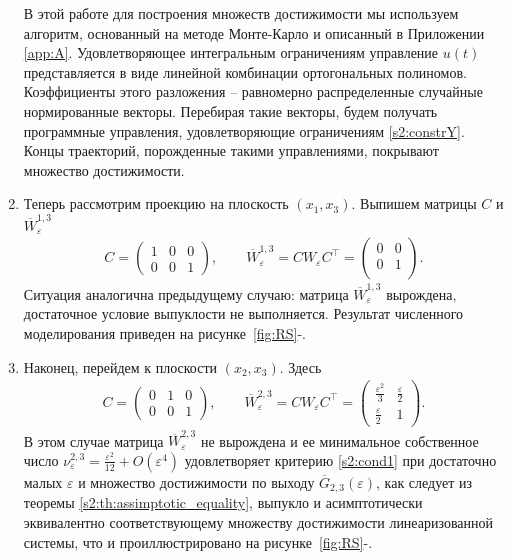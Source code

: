 \documentclass[../main.tex]{subfiles}
\begin{document}
\begin{enumerate}
В этой работе для построения множеств достижимости мы используем алгоритм, основанный на методе Монте-Карло и описанный в Приложении \ref{app:A}.
Удовлетворяющее интегральным ограничениям управление $ u(t) $ представляется в виде линейной комбинации ортогональных полиномов. 
Коэффициенты этого разложения -- равномерно распределенные случайные нормированные векторы. 
Перебирая такие векторы, будем получать программные управления, удовлетворяющие ограничениям \eqref{s2:constrY}. 
Концы траекторий, порожденные такими управлениями, покрывают множество достижимости.
        
        
        \item Теперь рассмотрим проекцию на плоскость $ (x_1, x_3) $. 
Выпишем матрицы $ C $ и $ \overline{W}_{\varepsilon}^{1,3} $
        \begin{gather*}
            C = \begin{pmatrix}
                1 & 0 & 0 \\
                0 & 0 & 1
            \end{pmatrix}, \qquad
            \overline{W}_{\varepsilon}^{1,3} =  C W_{\varepsilon} C^{\top}  =\begin{pmatrix}
                0 & 0 \\
                0 & 1 \\
            \end{pmatrix} .
        \end{gather*}
        Ситуация аналогична предыдущему случаю: матрица $ \overline{W}_{\varepsilon}^{1,3}  $ вырождена, достаточное условие выпуклости не выполняется. 
Результат численного моделирования приведен на рисунке~\ref{fig:RS}-.
        \item Наконец, перейдем к плоскости $ (x_2, x_3) $. 
Здесь
        \begin{gather*}
            C = \begin{pmatrix}
                0 & 1 & 0 \\
                0 & 0 & 1
            \end{pmatrix}, \qquad \overline{W}_{\varepsilon}^{2,3} =  C W_{\varepsilon} C^{\top}  =\begin{pmatrix}
                \frac{\varepsilon^2}{3} & \frac{\varepsilon}{2} \\
                \frac{\varepsilon}{2} & 1
            \end{pmatrix}.
        \end{gather*}
        В этом случае матрица $ \overline{W}_{\varepsilon}^{2,3} $ не вырождена и ее минимальное собственное число $ \nu^{2,3}_{\varepsilon} = \frac{\varepsilon^2}{12} + O(\varepsilon^4)  $ удовлетворяет критерию \eqref{s2:cond1} при достаточно малых $ \varepsilon $ и множество достижимости по выходу $ \overline{G}_{2,3}(\varepsilon) $, как следует из теоремы \ref{s2:th:assimptotic_equality}, выпукло и асимптотически эквивалентно соответствующему множеству достижимости линеаризованной системы, что и проиллюстрировано на рисунке~\ref{fig:RS}-. 

\end{enumerate}
\end{document}

